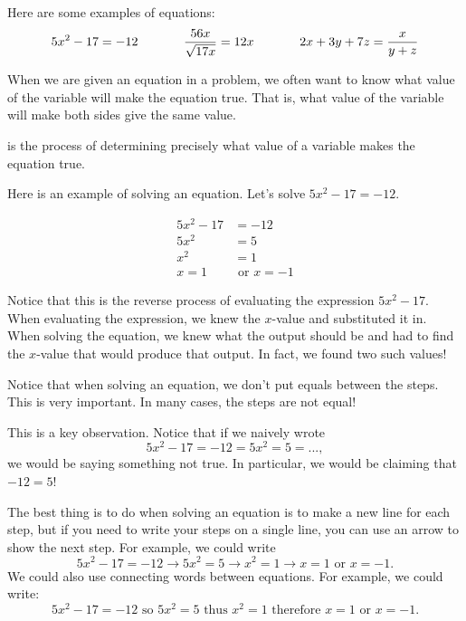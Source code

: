 \documentclass{ximera}
\begin{document}
Here are some examples of equations:
\[
5x^2-17=-12  \hspace{.5in}
\frac{56x}{\sqrt{17x}}=12x  \hspace{.5in}
2x+3y+7z=\frac{x}{y+z}
\]

When we are given an equation in a problem, we often want to know what value of the variable will make the equation true.  That is, what value of the variable will make both sides give the same value.

\begin{definition}
 is the process of determining precisely what value of a variable makes the equation true.
\end{definition}

Here is an example of solving an equation.  Let's solve $5x^2-17=-12$.

\begin{align*}
5x^2-17&=-12\\
5x^2&=5\\
x^2&=1\\
x=1 &\text{  or  }  x=-1
\end{align*}

Notice that this is the reverse process of evaluating the expression $5x^2-17$.  When evaluating the expression, we knew the $x$-value and substituted it in.  When solving the equation, we knew what the output should be and had to find the $x$-value that would produce that output.  In fact, we found two such values!

\begin{remark}
Notice that when solving an equation, we don't put equals between the steps.  This is very important.  In many cases, the steps are not equal! 
\end{remark}

This is a key observation.  Notice that if we naively wrote $$5x^2-17=-12=5x^2=5=...,$$ we would be saying something not true.  In particular, we would be claiming that $-12=5$!

The best thing is to do when solving an equation is to make a new line for each step, but if you need to write your steps on a single line, you can use an arrow to show the next step.  For example, we could write 
$$5x^2-17=-12 \rightarrow 5x^2=5 \rightarrow x^2=1 \rightarrow x=1 \text{  or  }  x=-1.$$  
We could also use connecting words between equations.  For example, we could write:
$$5x^2-17=-12 \text{ so } 5x^2=5 \text{ thus } x^2=1 \text{ therefore } x=1 \text{  or  }  x=-1.$$  
\end{document}
